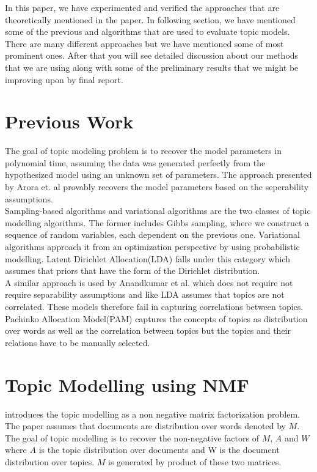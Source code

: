 \documentclass[a4paper,11pt]{article}
\begin{document}
In this paper, we have experimented and verified the approaches that are theoretically mentioned in the paper. In following section, we have mentioned some of the previous and algorithms that are used to evaluate topic models. There are many different approaches but we have mentioned some of most prominent ones. After that you will see detailed discussion about our methods that we are using along with some of the preliminary results that we might be improving upon by final report. \\

\section{Previous Work}

The goal of topic modeling problem is to recover the model parameters in polynomial time, assuming the data was generated perfectly from the hypothesized model using an unknown set of parameters. The approach presented by Arora et. al\cite{tm} provably recovers the model parameters based on the seperability assumptions. \\

Sampling-based algorithms and variational algorithms are the two classes of topic modelling algorithms. The former includes Gibbs sampling, where we construct a sequence of random variables, each dependent on the previous one. Variational algorithms approach it from an optimization perspective by using probabilistic modelling\cite{blei}. Latent Dirichlet Allocation(LDA) falls under this category which assumes that priors that have the form of the Dirichlet distribution.\\ 

A similar approach is used by Anandkumar et al\cite{anand12}. which does not require not require separability assumptions and like LDA assumes that topics are not correlated. These models therefore fail in capturing correlations between topics. Pachinko Allocation Model(PAM) captures the concepts of topics as distribution over words as well as the correlation between topics but the topics and their relations have to be manually selected\cite{pam}.



\section{Topic Modelling using NMF}
\cite{tm} introduces the topic modelling as a non negative matrix factorization problem. The paper assumes that documents are distribution over words denoted by $M$. The goal of topic modelling is to recover the non-negative factors of $M$, $A$ and $W$ where $A$ is the topic distribution over documents and W is the document distribution over topics. $M$ is generated by product of these two matrices.\\
\end{document}
